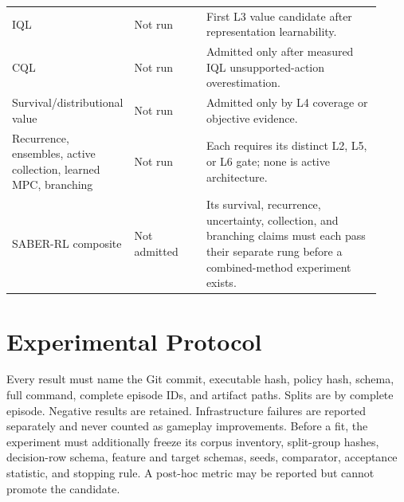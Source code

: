 \documentclass[11pt]{article}
\begin{document}
\begin{longtable}{@{}>{\raggedright\arraybackslash}p{0.22\linewidth}
                       >{\raggedright\arraybackslash}p{0.20\linewidth}
                       >{\raggedright\arraybackslash}p{0.50\linewidth}@{}}
IQL & Not run & First L3 value candidate after representation learnability. \\
CQL & Not run & Admitted only after measured IQL unsupported-action overestimation. \\
Survival/distributional value & Not run & Admitted only by L4 coverage or objective evidence. \\
Recurrence, ensembles, active collection, learned MPC, branching & Not run & Each requires its distinct L2, L5, or L6 gate; none is active architecture. \\
SABER-RL composite & Not admitted & Its survival, recurrence, uncertainty, collection, and branching claims must each pass their separate rung before a combined-method experiment exists. \\
\end{longtable}
\normalsize

\section{Experimental Protocol}

Every result must name the Git commit, executable hash, policy hash, schema,
full command, complete episode IDs, and artifact paths.  Splits are by complete
episode.  Negative results are retained.  Infrastructure failures are reported
separately and never counted as gameplay improvements.  Before a fit, the
experiment must additionally freeze its corpus inventory, split-group hashes,
decision-row schema, feature and target schemas, seeds, comparator, acceptance
statistic, and stopping rule.  A post-hoc metric may be reported but cannot
promote the candidate.
\end{document}
